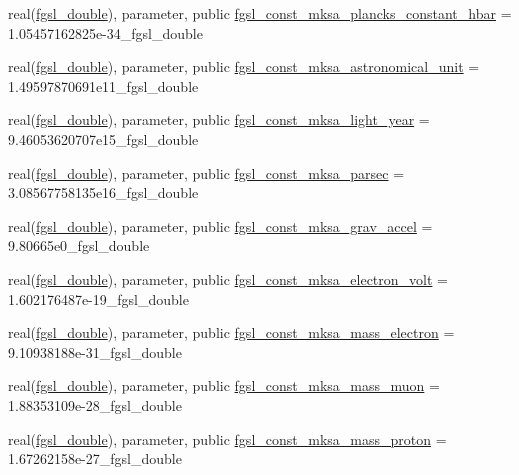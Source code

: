 \begin{DoxyCompactItemize}
real(\hyperlink{namespacefgsl_a9af5113378e0f000eb479d3f90196ddf}{fgsl\+\_\+double}), parameter, public \hyperlink{namespacefgsl_a505da32ff79a7c317534298642a2ac3c}{fgsl\+\_\+const\+\_\+mksa\+\_\+plancks\+\_\+constant\+\_\+hbar} = 1.\+05457162825e-\/34\+\_\+fgsl\+\_\+double
\item 
real(\hyperlink{namespacefgsl_a9af5113378e0f000eb479d3f90196ddf}{fgsl\+\_\+double}), parameter, public \hyperlink{namespacefgsl_aa2d41436d179db0d4d442c5207737611}{fgsl\+\_\+const\+\_\+mksa\+\_\+astronomical\+\_\+unit} = 1.\+49597870691e11\+\_\+fgsl\+\_\+double
\item 
real(\hyperlink{namespacefgsl_a9af5113378e0f000eb479d3f90196ddf}{fgsl\+\_\+double}), parameter, public \hyperlink{namespacefgsl_ac9efe31fa2e902dc8cced7ce8b82c610}{fgsl\+\_\+const\+\_\+mksa\+\_\+light\+\_\+year} = 9.\+46053620707e15\+\_\+fgsl\+\_\+double
\item 
real(\hyperlink{namespacefgsl_a9af5113378e0f000eb479d3f90196ddf}{fgsl\+\_\+double}), parameter, public \hyperlink{namespacefgsl_ab701318a50ffa3b0b31f26f7882a2b16}{fgsl\+\_\+const\+\_\+mksa\+\_\+parsec} = 3.\+08567758135e16\+\_\+fgsl\+\_\+double
\item 
real(\hyperlink{namespacefgsl_a9af5113378e0f000eb479d3f90196ddf}{fgsl\+\_\+double}), parameter, public \hyperlink{namespacefgsl_a7c644841a5ff5cd815dca7cfc3383642}{fgsl\+\_\+const\+\_\+mksa\+\_\+grav\+\_\+accel} = 9.\+80665e0\+\_\+fgsl\+\_\+double
\item 
real(\hyperlink{namespacefgsl_a9af5113378e0f000eb479d3f90196ddf}{fgsl\+\_\+double}), parameter, public \hyperlink{namespacefgsl_a2b715db04903e667b5f50d6df3054bee}{fgsl\+\_\+const\+\_\+mksa\+\_\+electron\+\_\+volt} = 1.\+602176487e-\/19\+\_\+fgsl\+\_\+double
\item 
real(\hyperlink{namespacefgsl_a9af5113378e0f000eb479d3f90196ddf}{fgsl\+\_\+double}), parameter, public \hyperlink{namespacefgsl_a9b37f99c3856817b93dd18bc94b81725}{fgsl\+\_\+const\+\_\+mksa\+\_\+mass\+\_\+electron} = 9.\+10938188e-\/31\+\_\+fgsl\+\_\+double
\item 
real(\hyperlink{namespacefgsl_a9af5113378e0f000eb479d3f90196ddf}{fgsl\+\_\+double}), parameter, public \hyperlink{namespacefgsl_afcace800f07f1c2e9703336d2ff02ba4}{fgsl\+\_\+const\+\_\+mksa\+\_\+mass\+\_\+muon} = 1.\+88353109e-\/28\+\_\+fgsl\+\_\+double
\item 
real(\hyperlink{namespacefgsl_a9af5113378e0f000eb479d3f90196ddf}{fgsl\+\_\+double}), parameter, public \hyperlink{namespacefgsl_a9b4432f549e95747550b45df3417757f}{fgsl\+\_\+const\+\_\+mksa\+\_\+mass\+\_\+proton} = 1.\+67262158e-\/27\+\_\+fgsl\+\_\+double

\end{DoxyCompactItemize}
